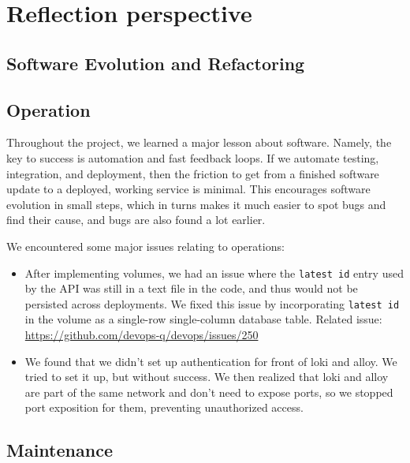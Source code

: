 \section{Reflection perspective} \label{rp}


\subsection{Software Evolution and Refactoring} %


\subsection{Operation} %
Throughout the project, we learned a major lesson about software. Namely, the key to success is automation and fast feedback loops. If we automate testing, integration, and deployment, then the friction to get from a finished software update to a deployed, working service is minimal. This encourages software evolution in small steps, which in turns makes it much easier to spot bugs and find their cause, and bugs are also found a lot earlier.

We encountered some major issues relating to operations:
\begin{itemize}
    \item After implementing volumes, we had an issue where the \texttt{latest id}
    entry used by the API was still in a text file in the code, and thus would
    not be persisted across deployments. We fixed this issue by incorporating
    \texttt{latest id} in the volume as a single-row single-column database
    table. Related issue: \url{https://github.com/devops-q/devops/issues/250}
    \item We found that we didn’t set up authentication for front of loki
    and alloy. We tried to set it up, but without success. We then realized 
    that loki and alloy are part of the same network and don’t need to expose ports,
    so we stopped port exposition for them, preventing unauthorized access.
\end{itemize}


\subsection{Maintenance} %


